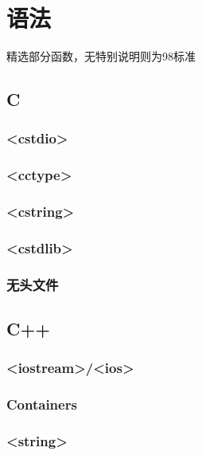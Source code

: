 \documentclass[10pt]{article}
\begin{document}
\section{语法}
精选部分函数，无特别说明则为98标准
\subsection{C}
\subsubsection{<cstdio>}

\subsubsection{<cctype>}

\subsubsection{<cstring>}

\subsubsection{<cstdlib>}

\subsubsection{无头文件}


\subsection{C++}
\subsubsection{<iostream>/<ios>}

\subsubsection{Containers}

\subsubsection{<string>}

%
%
%
\end{document}
